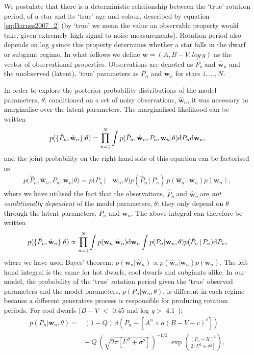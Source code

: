 \documentclass[11pt,preprint]{aastex}
\newcommand{\logg}{log \emph{g}}
\newcommand{\w}{\mathbf{w}}
\newcommand{\wh}{$\hat{\mathbf{w}}_n$}
\newcommand{\ph}{$\hat{P}_n$}
\newcommand{\subcut}{4.1~}
\begin{document}
We postulate that there is a deterministic relationship between the `true' rotation period, of a star and its `true' age and colour, described by equation \ref{eq:Barnes2007_2} (by `true' we mean the value an observable property would take, given extremely high signal-to-noise measurements).
Rotation period also depends on \logg$~$since this property determines whether a star falls in the dwarf or subgiant regime.
In what follows we define $\mathbf{w} = (A, B-V, log~g)$ as the vector of observational properties.
Observations are denoted as \ph$~$and $\hat{\mathbf{w}}_n$ and the unobserved (latent), `true' parameters as $P_n$ and $\mathbf{w}_n$ for stars $1,...,N$.

In order to explore the posterior probability distributions of the model parameters, $\theta$, conditioned on a set of noisy observations, \wh, it was necessary to marginalise over the latent parameters.
The marginalised likelihood can be written
\begin{equation}
	p(\{\hat{P}_n,\hat{\w}_n\}|\theta) =
	\prod_{n=1}^{N} \int p(\hat{P}_n,\hat{\w}_n,P_n,\w_n|\theta){\rm d}P_n {\rm d}\w_n,
\label{eq:fulll}
\end{equation}
and the joint probability on the right hand side of this equation can be factorised as
\begin{align}
	p(\hat{P}_n,\hat{\w}_n,P_n,\w_n|\theta) = p(P_n\,| & \,\w_n,\theta) p(\hat{P}_n\,|\,P_n)\,p(\hat{\w}_n\,|\,\w_n)p(\w_n),
\nonumber
\end{align}
where we have utilised the fact that the observations, \ph$~$and \wh$~$are {\it not conditionally dependent} of the model parameters, $\theta$: they only depend on $\theta$ through the latent parameters, $P_n$ and $\w_n$.
The above integral can therefore be written
\begin{equation}
	p(\{\hat{P}_n,\hat{\w}_n\}|\theta) \propto
	\prod_{n=1}^{N} \int p(\w_n|\hat{\w}_n) {\rm d}\w_n \int p(P_n|\w_n,\theta) p(\hat{P}_n\,|\,P_n) {\rm d}P_n,
\label{eq:fac}
\end{equation}
where we have used Bayes' theorem: $p(\w_n|\hat{\w}_n) \propto p(\hat{\w}_n|\w_n)p(\w_n)$.
The left hand integral is the same for hot dwarfs, cool dwarfs and subgiants alike.
In our model, the probability of the `true' rotation period given the `true' observed parameters and the model parameters, $p(P_n|\w_n, \theta)$, is different in each regime because a different generative process is responsible for producing rotation periods.
For cool dwarfs ($B-V$ $<$ 0.45 and \logg $>$ \subcut):
\begin{eqnarray}
p(P_n|\w_n,\theta) =
& (1-Q)~\delta \left (P_n - \left[A^n \times a(B-V - c)^b\right] \right) \quad \\
	& +~Q~\left(\sqrt{2\pi[U^2+\sigma^2]}\right)^{-1/2}~\exp\left({\frac{(P_n-X)^2}{2[U^2+\sigma^2]}}\right),
\end{eqnarray}
\end{document}
